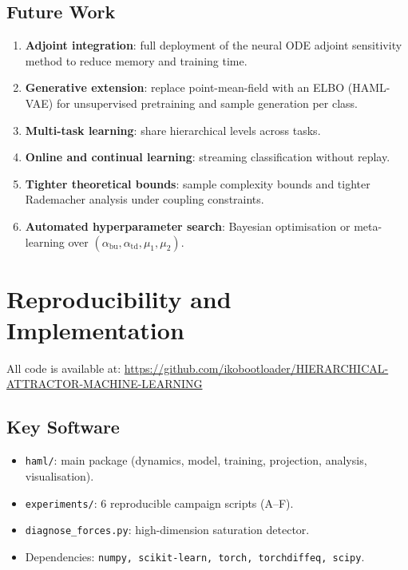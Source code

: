 \documentclass[11pt,a4paper]{article}
\begin{document}
\subsection{Future Work}
\label{sec:future}

\begin{enumerate}
  \item \textbf{Adjoint integration}: full deployment of the neural ODE adjoint sensitivity
        method to reduce memory and training time.
  \item \textbf{Generative extension}: replace point-mean-field with an ELBO (HAML-VAE) for
        unsupervised pretraining and sample generation per class.
  \item \textbf{Multi-task learning}: share hierarchical levels across tasks.
  \item \textbf{Online and continual learning}: streaming classification without replay.
  \item \textbf{Tighter theoretical bounds}: sample complexity bounds and tighter Rademacher
        analysis under coupling constraints.
  \item \textbf{Automated hyperparameter search}: Bayesian optimisation or meta-learning over
        $(\alpha_{\mathrm{bu}}, \alpha_{\mathrm{td}}, \mu_1, \mu_2)$.
\end{enumerate}

\section{Reproducibility and Implementation}

All code is available at:
\url{https://github.com/ikobootloader/HIERARCHICAL-ATTRACTOR-MACHINE-LEARNING}

\subsection{Key Software}

\begin{itemize}
  \item \texttt{haml/}: main package (dynamics, model, training, projection, analysis, visualisation).
  \item \texttt{experiments/}: 6 reproducible campaign scripts (A--F).
  \item \texttt{diagnose\_forces.py}: high-dimension saturation detector.
  \item Dependencies: \texttt{numpy, scikit-learn, torch, torchdiffeq, scipy}.
\end{itemize}
\end{document}
